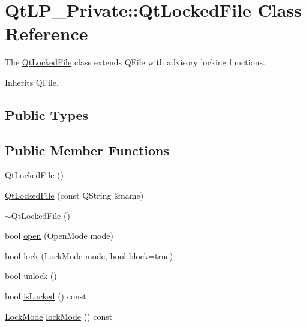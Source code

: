 \hypertarget{class_qt_l_p___private_1_1_qt_locked_file}{}\section{Qt\+L\+P\+\_\+\+Private\+:\+:Qt\+Locked\+File Class Reference}
\label{class_qt_l_p___private_1_1_qt_locked_file}


The \hyperlink{class_qt_l_p___private_1_1_qt_locked_file}{Qt\+Locked\+File} class extends Q\+File with advisory locking functions.  




Inherits Q\+File.

\subsection*{Public Types}
\subsection*{Public Member Functions}
\begin{DoxyCompactItemize}
\item 
\hyperlink{class_qt_l_p___private_1_1_qt_locked_file_a69bf1d82b1ca46f97466634d8f9587aa}{Qt\+Locked\+File} ()
\item 
\hyperlink{class_qt_l_p___private_1_1_qt_locked_file_a8b7a228ae02dca4bb99743219d0cdb7b}{Qt\+Locked\+File} (const Q\+String \&name)
\item 
\hyperlink{class_qt_l_p___private_1_1_qt_locked_file_ae22e087171c094da6cfb3282e838c9d4}{$\sim$\+Qt\+Locked\+File} ()
\item 
bool \hyperlink{class_qt_l_p___private_1_1_qt_locked_file_a2e81bbaa7b1aaa83cf79284e66dbad79}{open} (Open\+Mode mode)
\item 
bool \hyperlink{class_qt_l_p___private_1_1_qt_locked_file_af7876c08254a16d00022939f2fb9a8b8}{lock} (\hyperlink{class_qt_l_p___private_1_1_qt_locked_file_ab9a54228983e33cf1fb8dace52141f26}{Lock\+Mode} mode, bool block=true)
\item 
bool \hyperlink{class_qt_l_p___private_1_1_qt_locked_file_abb4d7e6211d9e6e14afaa661818fb2bf}{unlock} ()
\item 
bool \hyperlink{class_qt_l_p___private_1_1_qt_locked_file_ac93115b12ddd6c3275a5a81a94b6c919}{is\+Locked} () const 
\item 
\hyperlink{class_qt_l_p___private_1_1_qt_locked_file_ab9a54228983e33cf1fb8dace52141f26}{Lock\+Mode} \hyperlink{class_qt_l_p___private_1_1_qt_locked_file_aabfd6fb28f249a5fb01f3965de0e41f1}{lock\+Mode} () const 
\end{DoxyCompactItemize}


